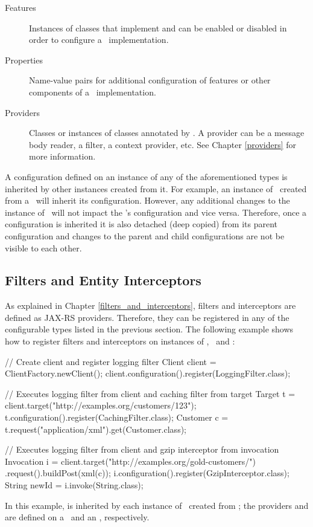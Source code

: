 \begin{description}
\item [Features] Instances of classes that implement  and can be enabled or disabled in order to configure a \jaxrs\ implementation.
\item [Properties] Name-value pairs for additional configuration of features or other components of a \jaxrs\ implementation.
\item [Providers] Classes or instances of classes annotated by \Provider. A provider can be a message body reader, a filter, a context provider, etc. See Chapter \ref{providers} for more information.
\end{description}

A configuration defined on an instance of any of the aforementioned types is inherited by other instances created from it. For example, an instance of \Target\ created from a \Client\ will inherit its configuration. However, any additional changes to the instance of \Target\ will not impact the \Client's configuration and vice versa. Therefore, once a configuration is inherited it is also detached (deep copied) from its parent configuration and changes to the parent and child configurations are not be visible to each other.

\subsection{Filters and Entity Interceptors}
\label{filters_interceptors_client}

As explained in Chapter \ref{filters_and_interceptors}, filters and interceptors are defined as JAX-RS providers. Therefore, they can be registered in any of the configurable types listed in the previous section. The following example shows how to register filters and interceptors on instances of \Client, \Target\ and \Invocation:

\begin{listing}{1}
// Create client and register logging filter
Client client = ClientFactory.newClient();
client.configuration().register(LoggingFilter.class);

// Executes logging filter from client and caching filter from target
Target t = client.target("http://examples.org/customers/123");
t.configuration().register(CachingFilter.class);
Customer c = t.request("application/xml").get(Customer.class);

// Executes logging filter from client and gzip interceptor from invocation
Invocation i = client.target("http://examples.org/gold-customers/")
    .request().buildPost(xml(c));
i.configuration().register(GzipInterceptor.class);
String newId = i.invoke(String.class);
\end{listing}

In this example,  is inherited by each instance of \Target\ created from ; the providers  and  are defined on a \Target\ and an \Invocation, respectively.









